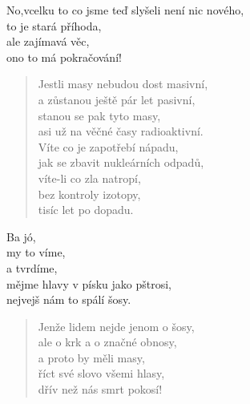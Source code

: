 \begin{song}
\begin{interlude}
No,vcelku to co jsme teď slyšeli není nic nového, \\
to je stará příhoda, \\
ale zajímavá věc, \\
ono to má pokračování!
\end{interlude}

\begin{verse}
Jestli masy nebudou dost masivní, \\
a zůstanou ještě pár let pasivní, \\
stanou se pak tyto masy, \\
asi už na věčné časy radioaktivní. \\
Víte co je zapotřebí nápadu, \\
jak se zbavit nukleárních odpadů, \\
víte-li co zla natropí, \\
bez kontroly izotopy, \\
tisíc let po dopadu.
\end{verse}

\begin{bridge}
Ba jó,  \\
my to víme,  \\
a tvrdíme,  \\
mějme hlavy v písku jako pštrosi,  \\
nejvejš nám to spálí šosy.
\end{bridge}

\begin{verse}
Jenže lidem nejde jenom o šosy, \\
ale o krk a o značné obnosy, \\
a proto by měli masy, \\
říct své slovo všemi hlasy, \\
dřív než nás smrt pokosí! 
\end{verse}

 
\end{song}
